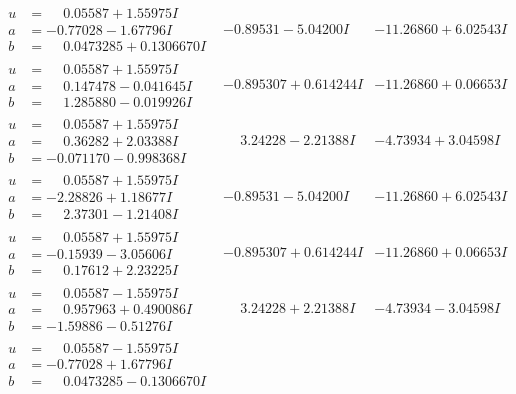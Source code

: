 \documentclass[1p]{elsarticle_modified}
\theoremstyle{definition}
\begin{document}
$$\begin{array}{c|c|c}
\begin{aligned}
u &= \phantom{-}0.05587 + 1.55975 I \\
a &= -0.77028 - 1.67796 I \\
b &= \phantom{-}0.0473285 + 0.1306670 I\end{aligned}
 & -0.89531 - 5.04200 I & -11.26860 + 6.02543 I \\ \hline\begin{aligned}
u &= \phantom{-}0.05587 + 1.55975 I \\
a &= \phantom{-}0.147478 - 0.041645 I \\
b &= \phantom{-}1.285880 - 0.019926 I\end{aligned}
 & -0.895307 + 0.614244 I & -11.26860 + 0.06653 I \\ \hline\begin{aligned}
u &= \phantom{-}0.05587 + 1.55975 I \\
a &= \phantom{-}0.36282 + 2.03388 I \\
b &= -0.071170 - 0.998368 I\end{aligned}
 & \phantom{-}3.24228 - 2.21388 I & -4.73934 + 3.04598 I \\ \hline\begin{aligned}
u &= \phantom{-}0.05587 + 1.55975 I \\
a &= -2.28826 + 1.18677 I \\
b &= \phantom{-}2.37301 - 1.21408 I\end{aligned}
 & -0.89531 - 5.04200 I & -11.26860 + 6.02543 I \\ \hline\begin{aligned}
u &= \phantom{-}0.05587 + 1.55975 I \\
a &= -0.15939 - 3.05606 I \\
b &= \phantom{-}0.17612 + 2.23225 I\end{aligned}
 & -0.895307 + 0.614244 I & -11.26860 + 0.06653 I \\ \hline\begin{aligned}
u &= \phantom{-}0.05587 - 1.55975 I \\
a &= \phantom{-}0.957963 + 0.490086 I \\
b &= -1.59886 - 0.51276 I\end{aligned}
 & \phantom{-}3.24228 + 2.21388 I & -4.73934 - 3.04598 I \\ \hline\begin{aligned}
u &= \phantom{-}0.05587 - 1.55975 I \\
a &= -0.77028 + 1.67796 I \\
b &= \phantom{-}0.0473285 - 0.1306670 I\end{aligned}

\end{array}$$
\end{document}
